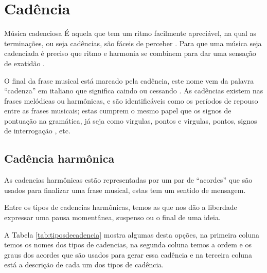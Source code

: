 \section{Cadência}
\label{sec:Cadencia}

\begin{tcbinformation}{Música cadenciosa}
\label{ref:musicacadenciosa}
É aquela que tem um ritmo facilmente apreciável, na qual as terminações, ou seja cadências,
são fáceis de perceber \cite[pp. 60]{pedrell2009diccionario}.
Para que uma música seja cadenciada é preciso que ritmo e harmonia se combinem  
para dar uma sensação de exatidão \cite[pp. 68]{melcior1859diccionario}.
\end{tcbinformation} 


O final da frase musical está marcado pela cadência, 
este nome vem da palavra ``cadenza''  em italiano que significa caindo ou cessando \cite[pp. 34]{bennett1993elementos} \cite[pp. 68]{melcior1859diccionario}. 
As cadências existem nas frases melódicas ou harmônicas, 
e são identificáveis como os períodos de repouso entre as frases musicais;
estas cumprem o mesmo papel que os signos de pontuação na gramática, 
já seja como virgulas, pontos e virgulas, pontos, signos de interrogação
\cite[pp. 66,67]{melcior1859diccionario} \cite[pp. 34]{bennett1993elementos}, 
etc.


\subsection{Cadência harmônica}
\label{sec:CadenciaHarmonica}

As cadencias harmônicas estão representadas por um par de ``acordes''
que são usados para finalizar uma frase musical, estas tem um sentido de mensagem. 

Entre os tipos de cadencias harmônicas, 
temos as que nos dão a liberdade expressar uma pausa momentânea, suspenso ou o final de uma ideia.

A Tabela \ref{tab:tiposdecadencia} mostra algumas desta opções, 
na primeira coluna temos os nomes dos tipos de cadencias,
na segunda coluna temos a ordem e os graus dos acordes que são usados para gerar essa cadência 
e na terceira coluna está a descrição de cada um dos tipos de cadência.

